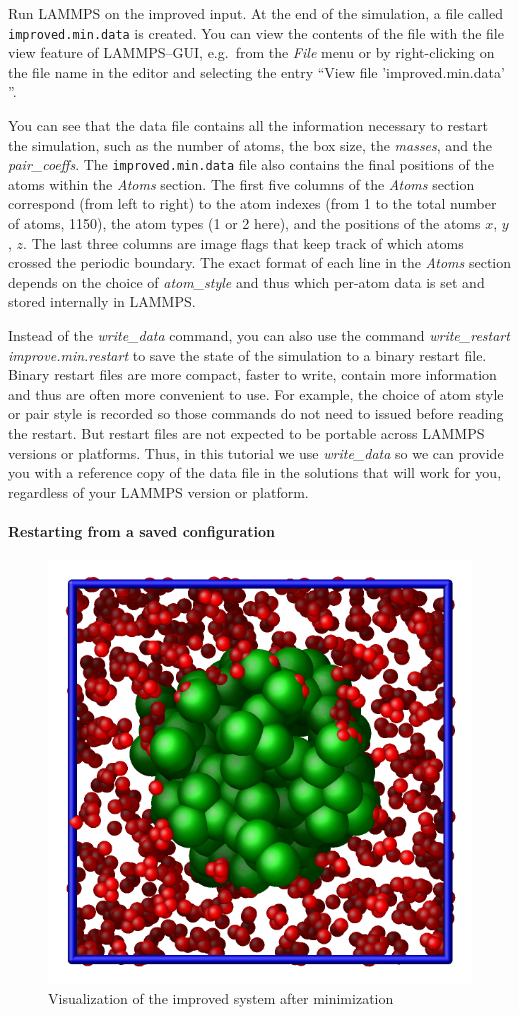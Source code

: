 \documentclass[9pt,tutorial]{livecoms}
\newcommand{\flecmd}[1]{\textcolor{command}{\texttt{#1}}} %
\begin{document}
Run LAMMPS on the improved input.  At the end of the simulation, a file
called \flecmd{improved.min.data} is created.  You can view the contents
of the file with the file view feature of LAMMPS--GUI, e.g.~from the
\textit{File} menu or by right-clicking on the file name in the editor
and selecting the entry ``View file 'improved.min.data' ''.

You can see that the data file contains all the information necessary to
restart the simulation, such as the number of atoms, the box size, the
\textit{masses}, and the \textit{pair\_coeffs}.  The
\flecmd{improved.min.data} file also contains the final
positions of the atoms within the \textit{Atoms} section. The first five
columns of the \textit{Atoms} section correspond (from left to right) to
the atom indexes (from 1 to the total number of atoms, 1150), the atom
types (1 or 2 here), and the positions of the atoms $x$, $y$, $z$. The
last three columns are image flags that keep track of which atoms
crossed the periodic boundary.  The exact format of each line in the
\textit{Atoms} section depends on the choice of \textit{atom\_style} and
thus which per-atom data is set and stored internally in LAMMPS.

\begin{note}
  Instead of the \textit{write\_data} command, you can also use the
  command \textit{write\_restart improve.min.restart} to save the state
  of the simulation to a binary restart file.  Binary restart files are
  more compact, faster to write, contain more information and thus are
  often more convenient to use.  For example, the choice of atom style
  or pair style is recorded so those commands do not need to issued
  before reading the restart.  But restart files are not expected to be
  portable across LAMMPS versions or platforms.  Thus, in this tutorial
  we use \textit{write\_data} so we can provide you with a reference
  copy of the data file in the solutions that will work for you,
  regardless of your LAMMPS version or platform.
\end{note}

\paragraph{Restarting from a saved configuration}

\begin{figure}
\centering
\includegraphics[width=0.55\linewidth]{LJ-cylinder}
\caption{Visualization of the improved system after minimization}
\label{fig:improved-min}
\end{figure}
\end{document}
